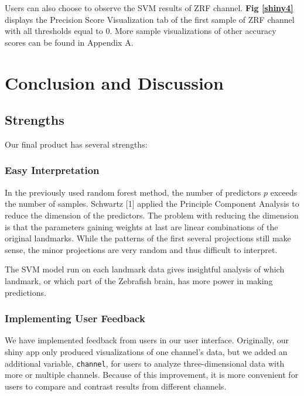 \documentclass[10pt,letterpaper]{article}
\begin{document}
Users can also choose to observe the SVM results of ZRF channel.
\textbf{Fig \ref{shiny4}} displays the Precision Score Visualization tab
of the first sample of ZRF channel with all thresholds equal to 0. More
sample visualizations of other accuracy scores can be found in Appendix
A.

\section{Conclusion and Discussion}\label{conclusion-and-discussion}

\subsection{Strengths}\label{strengths}

Our final product has several strengths:

\subsubsection{Easy Interpretation}\label{easy-interpretation}

In the previously used random forest method, the number of predictors
\(p\) exceeds the number of samples. Schwartz {[}1{]} applied the
Principle Component Analysis to reduce the dimension of the predictors.
The problem with reducing the dimension is that the parameters gaining
weights at last are linear combinations of the original landmarks. While
the patterns of the first several projections still make sense, the
minor projections are very random and thus difficult to interpret.

The SVM model run on each landmark data gives insightful analysis of
which landmark, or which part of the Zebrafish brain, has more power in
making predictions.

\subsubsection{Implementing User
Feedback}\label{implementing-user-feedback}

We have implemented feedback from users in our user interface.
Originally, our shiny app only produced visualizations of one channel's
data, but we added an additional variable, \texttt{channel}, for users
to analyze three-dimensional data with more or multiple channels.
Because of this improvement, it is more convenient for users to compare
and contrast results from different channels.
\end{document}
